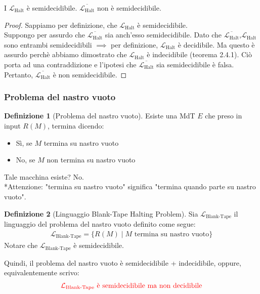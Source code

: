 \documentclass{article}  %
\theoremstyle{definition}
\newtheorem{definition}{Definizione}[section]
\begin{document}
\begin{theorem}{}
	I $\mathcal{L}_{\text{Halt}}$ è semidecidibile.
	$\overline{\mathcal{L}_{\text{Halt}}}$ non è semidecidibile.
	\footnotesize %
	\begin{proof}
		Sappiamo per definizione, che $\mathcal{L}_{\text{Halt}}$ è semidecidibile. \\
		Suppongo per assurdo che $\overline{\mathcal{L}_{\text{Halt}}}$ sia anch'esso semidecidibile. Dato che
		$\overline{\mathcal{L}_{\text{Halt}}}$,$\mathcal{L}_{\text{Halt}}$ sono entrambi semidecidibili $\implies$ per
		definizione, $\mathcal{L}_{\text{Halt}}$ è decidibile. Ma questo è assurdo perchè abbiamo dimostrato che
		$\mathcal{L}_{\text{Halt}}$ è indecidibile (teorema 2.4.1). Ciò porta ad una contraddizione e l'ipotesi che $\overline{\mathcal{L}_{\text{Halt}}}$
		sia semidecidibile è falsa. \\ Pertanto, $\overline{\mathcal{L}_{\text{Halt}}}$ è non semidecidibile.
	\end{proof}
\end{theorem}

\subsubsection{Problema del nastro vuoto}
\begin{definition}[Problema del nastro vuoto]
	Esiste una MdT $E$ che preso in input $R(M)$, termina dicendo:
	\begin{itemize}
		\item Sì, se $M$ termina su nastro vuoto
		\item No, se $M$ non termina su nastro vuoto
	\end{itemize}
	Tale macchina esiste? No. \\
	\footnotesize %
	*Attenzione: "termina su nastro vuoto" significa "termina quando parte su nastro vuoto".
\end{definition}
\begin{definition}[Linguaggio Blank-Tape Halting Problem]
	Sia $\mathcal{L}_{\text{Blank-Tape}}$ il linguaggio del problema del nastro vuoto definito come segue:
	\begin{align*}
		\mathcal{L}_{\text{Blank-Tape}} = \{R(M) \mid M \text{ termina su nastro vuoto}\}
	\end{align*}
	Notare che $\mathcal{L}_{\text{Blank-Tape}}$ è semidecidibile.
\end{definition}
Quindi, il problema del nastro vuoto è semidecidibile + indecidibile, oppure, equivalentemente scrivo:
\begin{align*}
	\textcolor{red}{\mathcal{L}_{\text{Blank-Tape}} \text{ è semidecidibile ma non decidibile}}
\end{align*}
\end{document}

